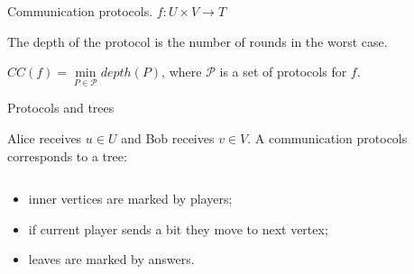 \begin{frame}{Communication protocols. $f: U \times V \to T$}
    \begin{center}
    	    
    \end{center}

    \pause
    \pause
    \pause
	\pause
    
    The depth of the protocol is the number of rounds in the worst case.
    
    $CC(f) = \min\limits_{P \in \mathcal{P}} depth(P)$, where $\mathcal{P}$ is a set of protocols for $f$.
\end{frame}

\begin{frame}{Protocols and trees}

    Alice receives $u \in U$ and Bob receives $v \in V$. A communication protocols corresponds to a tree:

    \begin{columns}[t]
		\begin{column}{0.7\textwidth}
            \begin{itemize}
                \item<2-> inner vertices are marked by players;
	            \item<3-> if current player sends a bit they move to next vertex;
    		    \item<8-> leaves are marked by answers.
	        \end{itemize}

        \end{column}
        
		\begin{column}{0.25\textwidth}
            
		\end{column}
	\end{columns}

\end{frame}


